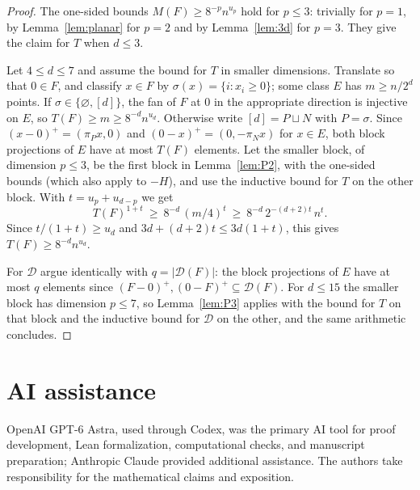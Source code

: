 \documentclass[11pt]{amsart}
\theoremstyle{definition}
\theoremstyle{remark}
\newcommand{\Dp}{\mathcal{D}}
\newcommand{\Mf}{M}
\newcommand{\Tf}{T}
\begin{document}
\begin{proof}
The one-sided bounds $\Mf(F)\ge 8^{-p}n^{u_p}$ hold for $p\le3$: trivially for $p=1$, by Lemma~\ref{lem:planar} for $p=2$ and by Lemma~\ref{lem:3d} for $p=3$. They give the claim for $\Tf$ when $d\le3$.

Let $4\le d\le7$ and assume the bound for $\Tf$ in smaller dimensions. Translate so that $0\in F$, and classify $x\in F$ by $\sigma(x)=\{i:x_i\ge0\}$; some class $E$ has $m\ge n/2^d$ points. If $\sigma\in\{\varnothing,[d]\}$, the fan of $F$ at $0$ in the appropriate direction is injective on $E$, so $\Tf(F)\ge m\ge 8^{-d}n^{u_d}$. Otherwise write $[d]=P\sqcup N$ with $P=\sigma$. Since $(x-0)^+=(\pi_Px,0)$ and $(0-x)^+=(0,-\pi_Nx)$ for $x\in E$, both block projections of $E$ have at most $\Tf(F)$ elements. Let the smaller block, of dimension $p\le3$, be the first block in Lemma~\ref{lem:P2}, with the one-sided bounds (which also apply to $-H$), and use the inductive bound for $\Tf$ on the other block. With $t=u_p+u_{d-p}$ we get
\[
\Tf(F)^{1+t}\ \ge\ 8^{-d}\,(m/4)^{t}\ \ge\ 8^{-d}\,2^{-(d+2)t}\,n^{t}.
\]
Since $t/(1+t)\ge u_d$ and $3d+(d+2)t\le3d(1+t)$, this gives $\Tf(F)\ge8^{-d}n^{u_d}$.

For $\Dp$ argue identically with $q=|\Dp(F)|$: the block projections of $E$ have at most $q$ elements since $(F-0)^+,(0-F)^+\subseteq\Dp(F)$. For $d\le15$ the smaller block has dimension $p\le7$, so Lemma~\ref{lem:P3} applies with the bound for $\Tf$ on that block and the inductive bound for $\Dp$ on the other, and the same arithmetic concludes.
\end{proof}

\newpage
\section*{AI assistance}
OpenAI GPT-6 Astra, used through Codex, was the primary AI tool for proof development, Lean formalization, computational checks, and manuscript preparation; Anthropic Claude provided additional assistance. The authors take responsibility for the mathematical claims and exposition.
\end{document}
